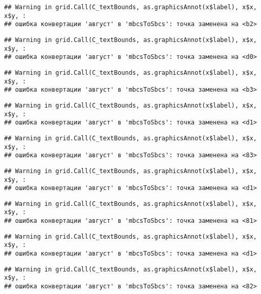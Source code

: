 \documentclass[
]{article}
\begin{document}
\begin{verbatim}
## Warning in grid.Call(C_textBounds, as.graphicsAnnot(x$label), x$x, x$y, :
## ошибка конвертации 'август' в 'mbcsToSbcs': точка заменена на <b2>
\end{verbatim}

\begin{verbatim}
## Warning in grid.Call(C_textBounds, as.graphicsAnnot(x$label), x$x, x$y, :
## ошибка конвертации 'август' в 'mbcsToSbcs': точка заменена на <d0>
\end{verbatim}

\begin{verbatim}
## Warning in grid.Call(C_textBounds, as.graphicsAnnot(x$label), x$x, x$y, :
## ошибка конвертации 'август' в 'mbcsToSbcs': точка заменена на <b3>
\end{verbatim}

\begin{verbatim}
## Warning in grid.Call(C_textBounds, as.graphicsAnnot(x$label), x$x, x$y, :
## ошибка конвертации 'август' в 'mbcsToSbcs': точка заменена на <d1>
\end{verbatim}

\begin{verbatim}
## Warning in grid.Call(C_textBounds, as.graphicsAnnot(x$label), x$x, x$y, :
## ошибка конвертации 'август' в 'mbcsToSbcs': точка заменена на <83>
\end{verbatim}

\begin{verbatim}
## Warning in grid.Call(C_textBounds, as.graphicsAnnot(x$label), x$x, x$y, :
## ошибка конвертации 'август' в 'mbcsToSbcs': точка заменена на <d1>
\end{verbatim}

\begin{verbatim}
## Warning in grid.Call(C_textBounds, as.graphicsAnnot(x$label), x$x, x$y, :
## ошибка конвертации 'август' в 'mbcsToSbcs': точка заменена на <81>
\end{verbatim}

\begin{verbatim}
## Warning in grid.Call(C_textBounds, as.graphicsAnnot(x$label), x$x, x$y, :
## ошибка конвертации 'август' в 'mbcsToSbcs': точка заменена на <d1>
\end{verbatim}

\begin{verbatim}
## Warning in grid.Call(C_textBounds, as.graphicsAnnot(x$label), x$x, x$y, :
## ошибка конвертации 'август' в 'mbcsToSbcs': точка заменена на <82>
\end{verbatim}
\end{document}
